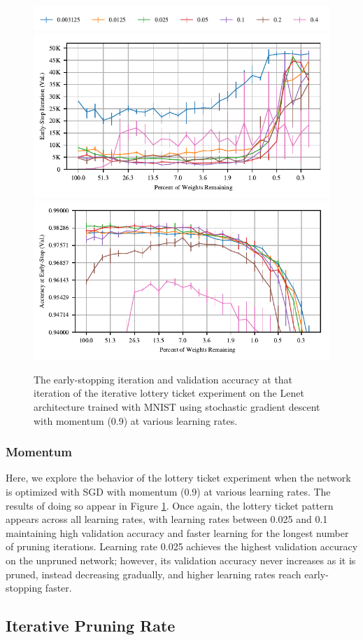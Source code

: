 \begin{figure}
\centering
\includegraphics[width=.7\textwidth]{graphs/mnist/lenet/momentum_rate_sweep/legend}
\includegraphics[width=.5\textwidth]{graphs/mnist/lenet/momentum_rate_sweep/iteration}%
\includegraphics[width=.5\textwidth]{graphs/mnist/lenet/momentum_rate_sweep/accuracy}
\caption{The early-stopping iteration and validation accuracy at that iteration of the iterative lottery ticket experiment on the Lenet architecture trained with MNIST using
stochastic gradient descent with momentum (0.9) at various learning rates.}
\label{fig:appendix-momentum}
\end{figure}

\subsubsection{Momentum}

Here, we explore the behavior of the lottery ticket experiment when the network is optimized with SGD with momentum (0.9) at various learning rates.
The results of doing so appear in Figure \ref{fig:appendix-momentum}.
Once again, the lottery ticket pattern appears across all learning rates, with learning rates between 0.025 and 0.1 maintaining high validation accuracy
and faster learning for the longest number of pruning iterations. Learning rate 0.025 achieves the highest validation accuracy on the
unpruned network; however, its validation accuracy never increases
as it is pruned, instead decreasing gradually, and higher learning rates reach early-stopping faster.

\subsection{Iterative Pruning Rate}


